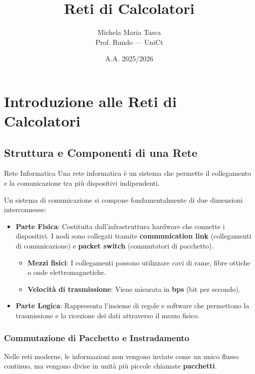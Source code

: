 \documentclass[12pt,a4paper,oneside]{book}
\title{Reti di Calcolatori}
\author{Michela Maria Tasca \\ \small Prof. Rundo --- UniCt}
\date{A.A. 2025/2026}
\begin{document}
\maketitle
\tableofcontents

\chapter{Introduzione alle Reti di Calcolatori}

\section{Struttura e Componenti di una Rete}

\begin{definition}{Rete Informatica}{}
Una rete informatica è un sistema che permette il collegamento e la comunicazione tra più dispositivi indipendenti.
\end{definition}

Un sistema di comunicazione si compone fondamentalmente di due dimensioni interconnesse:

\begin{itemize}
    \item \textbf{Parte Fisica}: Costituita dall'infrastruttura hardware che connette i dispositivi. I nodi sono collegati tramite \textbf{communication link} (collegamenti di comunicazione) e \textbf{packet switch} (commutatori di pacchetto).
    \begin{itemize}
        \item \textbf{Mezzi fisici}: I collegamenti possono utilizzare cavi di rame, fibre ottiche o onde elettromagnetiche.
        \item \textbf{Velocità di trasmissione}: Viene misurata in \textbf{bps} (bit per secondo).
    \end{itemize}
    \item \textbf{Parte Logica}: Rappresenta l'insieme di regole e software che permettono la trasmissione e la ricezione dei dati attraverso il mezzo fisico.
\end{itemize}

\subsection{Commutazione di Pacchetto e Instradamento}
Nelle reti moderne, le informazioni non vengono inviate come un unico flusso continuo, ma vengono divise in unità più piccole chiamate \textbf{pacchetti}.
\end{document}
